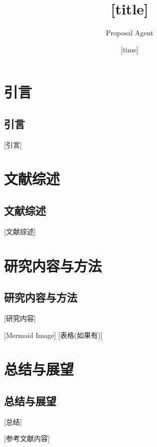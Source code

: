 \documentclass{phdproposal}
\title{[title]}
\author{Proposal Agent}
\date{[time]}
\begin{document}
\frontmatter

\maketitle

\clearpage
{}

\maketoc[nopagenum]

\clearpage
{}

\mainmatter


\chapter{引言}
\section{引言}

[引言]

\chapter{文献综述}
\section{文献综述}

[文献综述]

\chapter{研究内容与方法}
\section{研究内容与方法}

[研究内容]


[Mermaid Image]
[表格(如果有)]

\chapter{总结与展望}
\section{总结与展望}

[总结]




\backmatter


[参考文献内容]
% 
% 
\end{document}
